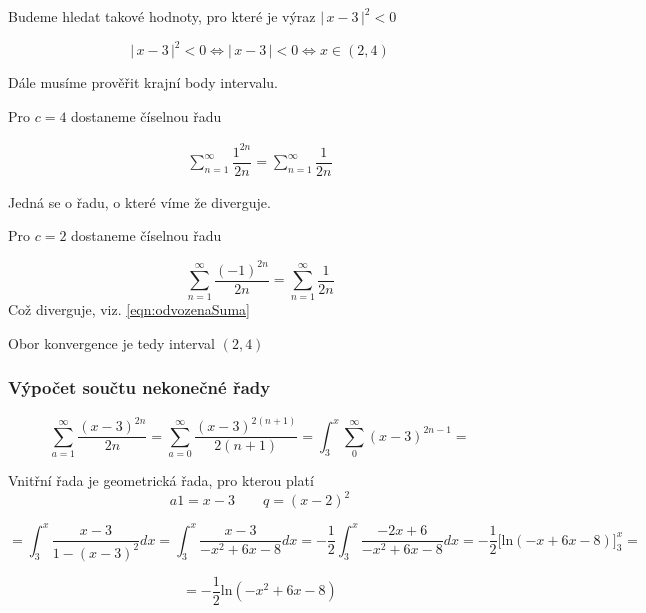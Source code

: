 \noindent Budeme hledat takové hodnoty, pro které je výraz $\big |\,x-3\,\big |^{2} < 0$

\begin{displaymath}
\big |\,x-3\,\big |^{2} < 0\Leftrightarrow \big |\,x-3\,\big | < 0 \Leftrightarrow x \in (2, 4)
\end{displaymath}

\noindent Dále musíme prověřit krajní body intervalu.
\vspace{10px}

\noindent Pro $c = 4$ dostaneme číselnou řadu

\begin{eqnarray}
\sum_{n=1}^{\infty} \dfrac{1^{2n}}{2n} = \sum_{n=1}^{\infty} \dfrac{1}{2n}
\label{eqn:odvozenaSuma}
\end{eqnarray}

\noindent Jedná se o řadu, o které víme že diverguje.
\vspace{10px}

\noindent Pro $c = 2$ dostaneme číselnou řadu

\begin{displaymath}
\sum_{n=1}^{\infty} \dfrac{(-1)^{2n}}{2n} = \sum_{n=1}^{\infty} \dfrac{1}{2n}
\end{displaymath}
\noindent Což diverguje, viz. \ref{eqn:odvozenaSuma}

\vspace{10px}

\noindent Obor konvergence je tedy interval $(2, 4)$

\subsubsection{Výpočet součtu nekonečné řady}

\begin{displaymath}
\sum_{a = 1}^{\infty} \dfrac{(x - 3)^{2n}}{2n} = \sum_{a = 0}^{\infty} \dfrac{(x - 3)^{2(n + 1)}}{2(n + 1)} = \int_{3}^{x} \sum_0^{\infty} (x - 3)^{2n - 1} =
\end{displaymath}

Vnitřní řada je geometrická řada, pro kterou platí
\begin{displaymath}
a1 = x - 3 \qquad q = (x - 2)^2
\end{displaymath}

\begin{displaymath}
= \int_{3}^{x} \dfrac{x - 3}{1 - (x - 3)^2}dx =  \int_{3}^{x} \dfrac{x - 3}{- x^2+6x-8}dx = - \frac{1}{2}  \int_{3}^{x} \dfrac{-2x + 6}{- x^2+6x-8}dx =- \frac{1}{2} \Big [  \mbox{ln}(-x + 6x - 8) \Big ]_3^x = 
\end{displaymath}

\begin{displaymath}
= - \frac{1}{2} \mbox{ln}(-x^2 + 6x - 8)
\end{displaymath}



